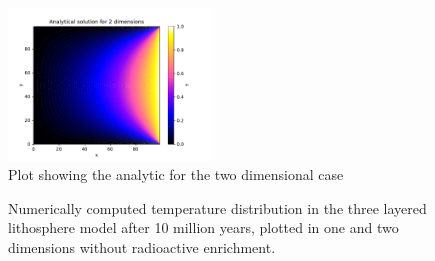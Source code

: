 \documentclass[10pt,a4paper]{article}
\begin{document}
\begin{figure} [H]
	\centering
	\includegraphics[width=0.48\textwidth]{../plots/2Danal.pdf}
	\caption{\label{fig:2danal} Plot showing the analytic for the two dimensional case}
\end{figure}




\begin{figure} [H]
	\centering
	\caption{\label{10notenriched}Numerically computed temperature distribution in the three layered lithosphere model after 10 million years, plotted in one and two dimensions without radioactive enrichment. }
\end{figure}
\end{document}
